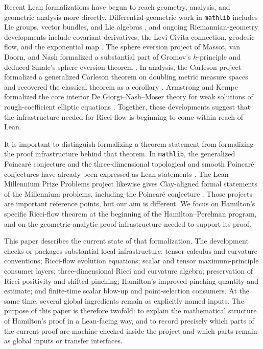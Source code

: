 \documentclass[11pt]{article}
\theoremstyle{plain}
\theoremstyle{definition}
\theoremstyle{remark}
\begin{document}
Recent Lean formalizations have begun to reach geometry, analysis, and
geometric analysis more directly.  Differential-geometric work in
\texttt{mathlib} includes Lie groups, vector bundles, and Lie algebras
\cite{BordgCavalleriDGLean}, and ongoing Riemannian-geometry developments
include covariant derivatives, the Levi-Civita connection, geodesic flow, and
the exponential map \cite{RothgangDGMathlib}.  The sphere eversion project of
Massot, van Doorn, and Nash formalized a substantial part of Gromov's
$h$-principle and deduced Smale's sphere eversion theorem
\cite{MassotVanDoornNashSphereEversion}.  In analysis, the Carleson project
formalized a generalized Carleson theorem on doubling metric measure spaces and
recovered the classical theorem as a corollary \cite{CarlesonLean}.  Armstrong
and Kempe formalized the core interior De Giorgi--Nash--Moser theory for weak
solutions of rough-coefficient elliptic equations \cite{ArmstrongKempeDGNM}.
Together, these developments suggest that the infrastructure needed for Ricci
flow is beginning to come within reach of Lean.

It is important to distinguish formalizing a theorem statement from formalizing
the proof infrastructure behind that theorem.  In \texttt{mathlib}, the
generalized Poincar\'e conjecture and the three-dimensional topological and
smooth Poincar\'e conjectures have already been expressed as Lean statements
\cite{XuPoincareMathlib}.  The Lean Millennium Prize Problems project likewise
gives Clay-aligned formal statements of the Millennium problems, including the
Poincar\'e conjecture \cite{LeanMillenniumPrizeProblems}.  Those projects are
important reference points, but our aim is different.  We focus on Hamilton's
specific Ricci-flow theorem at the beginning of the Hamilton--Perelman program,
and on the geometric-analytic proof infrastructure needed to support its proof.

This paper describes the current state of that formalization.  The development
checks or packages substantial local infrastructure: tensor calculus and
curvature conventions; Ricci-flow evolution equations; scalar and tensor
maximum-principle consumer layers; three-dimensional Ricci and curvature
algebra; preservation of Ricci positivity and shifted pinching; Hamilton's
improved pinching quantity and estimate; and finite-time scalar blow-up and
point-selection consumers.  At the same time, several global ingredients remain
as explicitly named inputs.  The purpose of this paper is therefore twofold: to
explain the mathematical structure of Hamilton's proof in a Lean-facing way,
and to record precisely which parts of the current proof are machine-checked
inside the project and which parts remain as global inputs or transfer interfaces.
\end{document}
